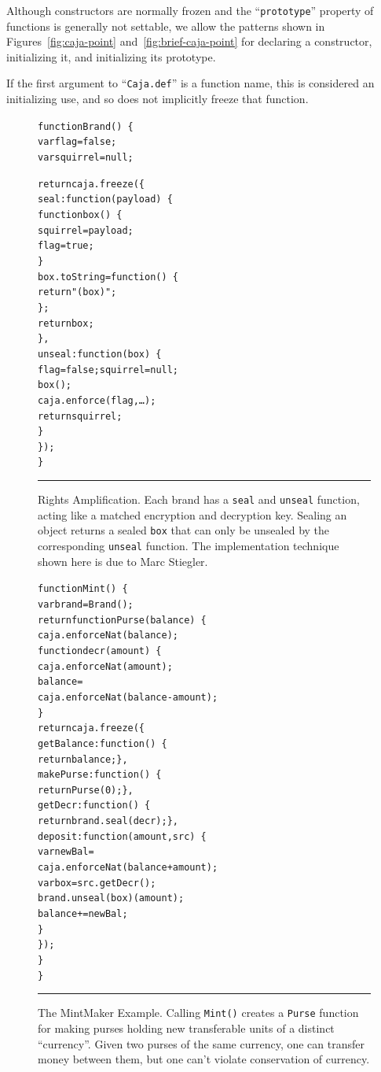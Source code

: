 \documentclass[letterpaper,twocolumn,10pt]{article}
\newcommand{\code}[1]{{\tt {#1}}}              %
\begin{document}
Although constructors are normally frozen and the ``\code{prototype}'' 
property of functions is generally not settable, we allow the 
patterns shown in Figures~\ref{fig:caja-point} and~\ref{fig:brief-caja-point} 
for declaring a constructor, initializing it, and initializing its prototype.

If the first argument to ``\code{Caja.def}'' is a function name, this is 
considered an initializing use, and so does not implicitly freeze that 
function. 

\begin{figure}[t!]
\begin{alltt}
function Brand()\ \{
  var flag = false;
  var squirrel = null;

  return caja.freeze(\{
    seal: function(payload)\ \{
      function box()\ \{
        squirrel = payload;
        flag = true;
      \}
      box.toString = function()\ \{
        return "(box)";
      \};
      return box;
    \},
    unseal: function(box)\ \{
      flag = false; squirrel = null;
      box();
      caja.enforce(flag,\ldots);
      return squirrel;
    \}
  \});
\}
\end{alltt}

\caption[Rights Amplification]{Rights Amplification. Each brand has a 
\code{seal} and \code{unseal} function, acting like a matched encryption and 
decryption key. Sealing an object returns a sealed \code{box} that can only 
be unsealed by the corresponding \code{unseal} function. The implementation 
technique shown here is due to Marc Stiegler.
\\ } \hrule
\label{fig:rights-amp}
\end{figure}

\begin{figure}[t!]
\begin{alltt}
function Mint()\ \{
  var brand = Brand();
  return function Purse(balance)\ \{
    caja.enforceNat(balance);
    function decr(amount)\ \{
      caja.enforceNat(amount);
      balance = 
        caja.enforceNat(balance - amount);
    \}
    return caja.freeze(\{
      getBalance: function()\ \{
        return balance; \},
      makePurse: function()\ \{
        return Purse(0); \},
      getDecr: function()\ \{
        return brand.seal(decr); \},
      deposit: function(amount,src)\ \{
        var newBal = 
          caja.enforceNat(balance+amount);
        var box = src.getDecr();
        brand.unseal(box)(amount);
        balance += newBal;
      \}
    \});
  \}
\}
\end{alltt}

\caption[The MintMaker Example]{The MintMaker Example. Calling \code{Mint()} 
creates a \code{Purse} function for making purses holding new transferable 
units of a distinct ``currency''. Given two purses of the same currency, one 
can transfer money between them, but one can't violate conservation of 
currency. \\ } \hrule
\label{fig:mintmaker}
\end{figure}
\end{document}
